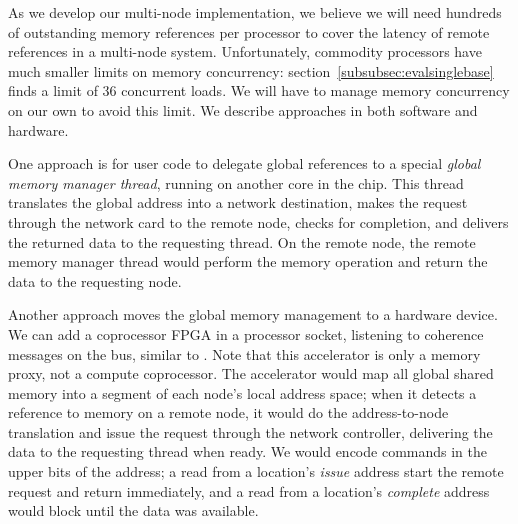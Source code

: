 \documentclass[10pt,nocopyrightspace,preprint]{sigplanconf}
\begin{document}
As we develop our multi-node implementation, we believe we will need hundreds of outstanding memory references per
processor to cover the latency of remote references in a multi-node
system. Unfortunately, commodity processors have much smaller limits
on memory concurrency: section~\ref{subsubsec:evalsinglebase} finds a
limit of 36 concurrent loads. We will have to manage memory
concurrency on our own to avoid this limit. We describe approaches in
both software and hardware.

One approach is for user code to delegate global references to a
special {\em global memory manager thread}, running on another core in
the chip. This thread translates the global address into a network
destination, makes the request through the network card to the remote
node, checks for completion, and delivers the returned data to the
requesting thread. On the remote node, the remote memory manager
thread would perform the memory operation and return the data to the
requesting node.


Another approach moves the global memory management to a hardware
device. We can add a coprocessor FPGA in a processor socket, listening
to coherence messages on the bus, similar to \cite{mogill}. Note that
this accelerator is only a memory proxy, not a compute
coprocessor. The accelerator would map all global shared memory into a
segment of each node's local address space; when it detects a
reference to memory on a remote node, it would do the address-to-node
translation and issue the request through the network controller,
delivering the data to the requesting thread when ready. We would
encode commands in the upper bits of the address; a read from a
location's {\em issue} address start the remote request and return
immediately, and a read from a location's {\em complete} address would
block until the data was available.


\end{document}
